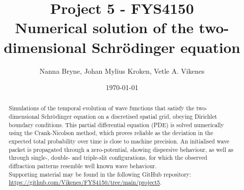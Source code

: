 



\title{Project 5 - FYS4150 \\
Numerical solution of the two-dimensional Schrödinger equation
} 
\author{Nanna Bryne, Johan Mylius Kroken, Vetle A. Vikenes} 
\date{\today}                             
\noaffiliation                            

\begin{abstract}
    Simulations of the temporal evolution of wave functions that satisfy the two-dimensional Schrödinger equation on a discretised spatial grid, obeying Dirichlet boundary conditions. This partial differential equation (PDE) is solved numerically using the Crank-Nicolson method, which proves reliable as the deviation in the expected total probability over time is close to machine precision. An initialised wave packet is propagated through a zero-potential, showing dispersive behaviour, as well as through single-, double- and triple-slit configurations, for which the observed diffraction patterns resemble well known wave behaviour. \\
    Supporting material may be found in the following GitHub repository: \url{https://github.com/Vikenes/FYS4150/tree/main/project5}.
\end{abstract}
\maketitle






% 














